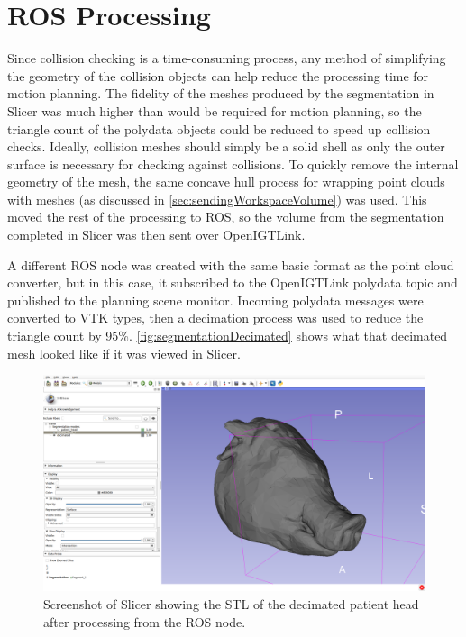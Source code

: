 \documentclass[12pt]{report}
\begin{document}
\section{ROS Processing}
Since collision checking is a time-consuming process, any method of simplifying the geometry of the collision objects can help reduce the processing time for motion planning. The fidelity of the meshes produced by the segmentation in Slicer was much higher than would be required for motion planning, so the triangle count of the polydata objects could be reduced to speed up collision checks. Ideally, collision meshes should simply be a solid shell as only the outer surface is necessary for checking against collisions. To quickly remove the internal geometry of the mesh, the same concave hull process for wrapping point clouds with meshes (as discussed in \autoref{sec:sendingWorkspaceVolume}) was used. This moved the rest of the processing to ROS, so the volume from the segmentation completed in Slicer was then sent over OpenIGTLink. 

A different ROS node was created with the same basic format as the point cloud converter, but in this case, it subscribed to the OpenIGTLink polydata topic and published to the planning scene monitor. Incoming polydata messages were converted to VTK types, then a decimation process was used to reduce the triangle count by 95\%. \autoref{fig:segmentationDecimated} shows what that decimated mesh looked like if it was viewed in Slicer.

\begin{figure}[thpb]
	\centering
	\includegraphics[width=\textwidth]{images/segmentation_decimated.png}
    \caption{Screenshot of Slicer showing the STL of the decimated patient head after processing from the ROS node.}
    \label{fig:segmentationDecimated}
\end{figure}
\end{document}
